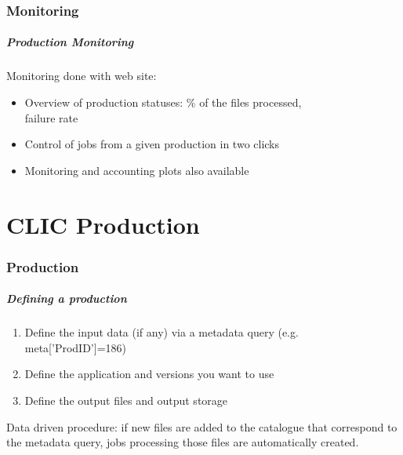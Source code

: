 \documentclass{beamer}
\begin{document}
\section{Monitoring}
{
\begin{frame}
\frametitle{Production Monitoring}
Monitoring done with web site: 
\begin{itemize}
\item Overview of production statuses: \% of the files processed,\\ failure rate
\item Control of jobs from a given production in two clicks
\item Monitoring and accounting plots also available
\end{itemize}

\end{frame}
}
\part{CLIC Production}
\begin{frame}
\partpage 
\end{frame}

\section{Production}
\begin{frame}
\frametitle{Defining a production} 
\begin{enumerate}
\item Define the input data (if any) via a metadata query (e.g. meta['ProdID']=186)
\item Define the application and versions you want to use
\item Define the output files and output storage
\end{enumerate}
\alert{Data driven procedure}: if new files are added to the catalogue that correspond to the metadata query, jobs processing those files are automatically created.
\end{frame}
\end{document}
